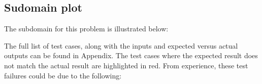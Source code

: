 \documentclass[letterpaper]{article}
\begin{document}
\subsection{Sudomain plot}
The subdomain for this problem is illustrated below:
\begin{figure}[H]
	\centering
{}
\end{figure}
The full list of test cases, along with the inputs and expected versus actual outputs can be found in Appendix.
The test cases where the expected result does not match the actual result are highlighted in red.
From experience, these test failures could be due to the following:
\end{document}
